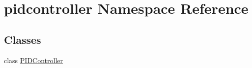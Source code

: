 \hypertarget{namespacepidcontroller}{}\section{pidcontroller Namespace Reference}
\label{namespacepidcontroller}
\subsection*{Classes}
\begin{DoxyCompactItemize}
\item 
class \mbox{\hyperlink{classpidcontroller_1_1PIDController}{P\+I\+D\+Controller}}
\end{DoxyCompactItemize}
